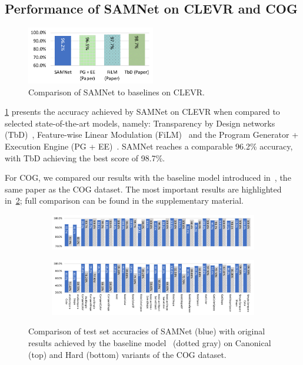 \subsection{Performance of SAMNet on CLEVR and COG}
\label{sec:baseline-compare}

\begin{figure}[!b]
	\centering
	\includegraphics[width=0.5\textwidth]{../img/plots/clevr_baselines.pdf}
	\caption{Comparison of SAMNet to baselines on CLEVR.}
	\label{fig:clevr_baselines}
\end{figure}

\cref{fig:clevr_baselines} presents the accuracy achieved by SAMNet on CLEVR
when compared to selected state-of-the-art models, namely: Transparency by Design networks (TbD)~\cite{mascharka2018transparency}, Feature-wise Linear Modulation (FiLM)~\cite{perez2018film} and the Program Generator + Execution Engine (PG + EE)~\cite{johnson2017inferring}.
SAMNet reaches a comparable 96.2\% accuracy, with TbD achieving the best score of 98.7\%.

For COG, we compared our results with the baseline model introduced in~\cite{yang2018dataset}, the same paper as the COG dataset.
The most important results are highlighted in~\cref{fig:samnet_cog_detailed}; full comparison can be found in the supplementary material.

\begin{figure}[!t]
	\centering
	\begin{subfigure}{\textwidth}
		\centering
		\includegraphics[width=\textwidth]{../img/plots/cog_canonical_baseline_no_labels.pdf}
	\end{subfigure}%
	\newline
	\begin{subfigure}{\textwidth}
		\centering
		\includegraphics[width=\textwidth]{../img/plots/cog_hard_baseline_labels.pdf}
	\end{subfigure}%
	\caption{Comparison of test set accuracies of SAMNet (blue) with original results achieved by the baseline model~\cite{yang2018dataset} (dotted gray) on Canonical (top) and Hard (bottom) variants of the COG dataset.}
	\label{fig:samnet_cog_detailed}\vspace{-10pt}
\end{figure}


